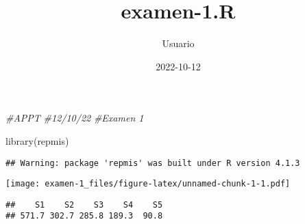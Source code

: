 \documentclass[
]{article}
\title{examen-1.R}
\author{Usuario}
\date{2022-10-12}
\newenvironment{Shaded}{\begin{snugshade}}{\end{snugshade}}
\newcommand{\AttributeTok}[1]{\textcolor[rgb]{0.77,0.63,0.00}{#1}}
\newcommand{\CommentTok}[1]{\textcolor[rgb]{0.56,0.35,0.01}{\textit{#1}}}
\newcommand{\FunctionTok}[1]{\textcolor[rgb]{0.00,0.00,0.00}{#1}}
\newcommand{\NormalTok}[1]{#1}
\newcommand{\OtherTok}[1]{\textcolor[rgb]{0.56,0.35,0.01}{#1}}
\newcommand{\SpecialCharTok}[1]{\textcolor[rgb]{0.00,0.00,0.00}{#1}}
\newcommand{\StringTok}[1]{\textcolor[rgb]{0.31,0.60,0.02}{#1}}
\begin{document}
\maketitle

\begin{Shaded}
\begin{Highlighting}[]
\CommentTok{\#APPT}
\CommentTok{\#12/10/22}
\CommentTok{\#Examen 1}

\FunctionTok{library}\NormalTok{(repmis)}
\end{Highlighting}
\end{Shaded}

\begin{verbatim}
## Warning: package 'repmis' was built under R version 4.1.3
\end{verbatim}

\begin{Shaded}
\end{Shaded}

\texttt{[image: examen-1\_files/figure-latex/unnamed-chunk-1-1.pdf]}

\begin{Shaded}
\end{Shaded}

\begin{verbatim}
##    S1    S2    S3    S4    S5 
## 571.7 302.7 285.8 189.3  90.8
\end{verbatim}

\begin{Shaded}
\end{Shaded}
\end{document}
